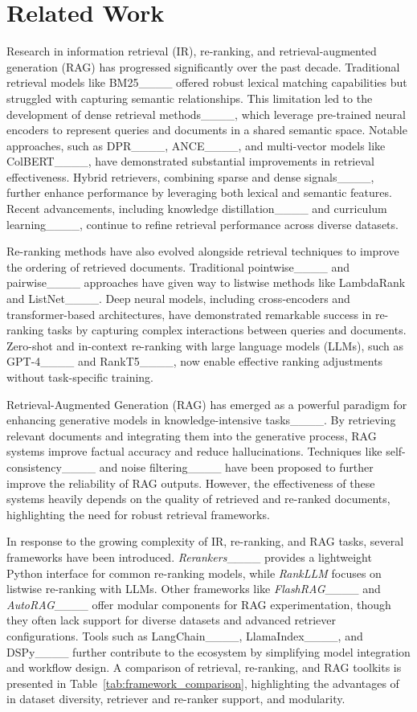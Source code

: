 \section{Related Work}
\label{s:related_work}
Research in information retrieval (IR), re-ranking, and retrieval-augmented generation (RAG) has progressed significantly over the past decade. Traditional retrieval models like BM25____ offered robust lexical matching capabilities but struggled with capturing semantic relationships. This limitation led to the development of dense retrieval methods____, which leverage pre-trained neural encoders to represent queries and documents in a shared semantic space. Notable approaches, such as DPR____, ANCE____, and multi-vector models like ColBERT____, have demonstrated substantial improvements in retrieval effectiveness. Hybrid retrievers, combining sparse and dense signals____, further enhance performance by leveraging both lexical and semantic features. Recent advancements, including knowledge distillation____ and curriculum learning____, continue to refine retrieval performance across diverse datasets.

Re-ranking methods have also evolved alongside retrieval techniques to improve the ordering of retrieved documents. Traditional pointwise____ and pairwise____ approaches have given way to listwise methods like LambdaRank and ListNet____. Deep neural models, including cross-encoders and transformer-based architectures, have demonstrated remarkable success in re-ranking tasks by capturing complex interactions between queries and documents. Zero-shot and in-context re-ranking with large language models (LLMs), such as GPT-4____ and RankT5____, now enable effective ranking adjustments without task-specific training.

Retrieval-Augmented Generation (RAG) has emerged as a powerful paradigm for enhancing generative models in knowledge-intensive tasks____. By retrieving relevant documents and integrating them into the generative process, RAG systems improve factual accuracy and reduce hallucinations. Techniques like self-consistency____ and noise filtering____ have been proposed to further improve the reliability of RAG outputs. However, the effectiveness of these systems heavily depends on the quality of retrieved and re-ranked documents, highlighting the need for robust retrieval frameworks.

In response to the growing complexity of IR, re-ranking, and RAG tasks, several frameworks have been introduced. \textit{Rerankers}____ provides a lightweight Python interface for common re-ranking models, while \textit{RankLLM} focuses on listwise re-ranking with LLMs. Other frameworks like \textit{FlashRAG}____ and \textit{AutoRAG}____ offer modular components for RAG experimentation, though they often lack support for diverse datasets and advanced retriever configurations. Tools such as LangChain____, LlamaIndex____, and DSPy____ further contribute to the ecosystem by simplifying model integration and workflow design.  A comparison of retrieval, re-ranking, and RAG toolkits is presented in Table~\ref{tab:framework_comparison}, highlighting the advantages of \framework in dataset diversity, retriever and re-ranker support, and modularity.




